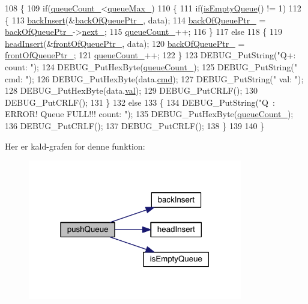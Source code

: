 \begin{DoxyCode}
108 \{
109   \textcolor{keywordflow}{if}(\hyperlink{class_queue_ad260f9ccca00e80d161bbf3e70c3ffa6}{queueCount\_}<\hyperlink{class_queue_acb6b6e88c9e4d12839594b31e6ff7c5a}{queueMax\_})
110   \{
111     \textcolor{keywordflow}{if}(\hyperlink{class_queue_aafb324c79731abdc228dbf94d86722a3}{isEmptyQueue}() != 1)
112     \{
113       \hyperlink{class_queue_a5a25a737ba7dff74923f5cb04e19164c}{backInsert}(&\hyperlink{class_queue_a225d2c9ad4e83d6da443e99b8869a51c}{backOfQueuePtr\_}, data);
114       \hyperlink{class_queue_a225d2c9ad4e83d6da443e99b8869a51c}{backOfQueuePtr\_} = \hyperlink{class_queue_a225d2c9ad4e83d6da443e99b8869a51c}{backOfQueuePtr\_}->\hyperlink{queue_8c_a882bca6dea645e11ca1df6bc3c30ac42}{next\_};
115       \hyperlink{class_queue_ad260f9ccca00e80d161bbf3e70c3ffa6}{queueCount\_}++;
116     \}
117     \textcolor{keywordflow}{else}
118     \{
119       \hyperlink{class_queue_a1189c09234d75518492525645a05db07}{headInsert}(&\hyperlink{class_queue_aa48f05218d0a78402821c8aa9bdad06a}{frontOfQueuePtr\_}, data);
120       \hyperlink{class_queue_a225d2c9ad4e83d6da443e99b8869a51c}{backOfQueuePtr\_} = \hyperlink{class_queue_aa48f05218d0a78402821c8aa9bdad06a}{frontOfQueuePtr\_};
121       \hyperlink{class_queue_ad260f9ccca00e80d161bbf3e70c3ffa6}{queueCount\_}++;
122     \}
123     DEBUG\_PutString(\textcolor{stringliteral}{"Q+: count: "});
124     DEBUG\_PutHexByte(\hyperlink{class_queue_ad260f9ccca00e80d161bbf3e70c3ffa6}{queueCount\_});
125     DEBUG\_PutString(\textcolor{stringliteral}{" cmd: "});
126     DEBUG\_PutHexByte(data.\hyperlink{queue_8h_a85092d82ab6ea85dad51ba78cbda36a0}{cmd});
127     DEBUG\_PutString(\textcolor{stringliteral}{" val: "});
128     DEBUG\_PutHexByte(data.\hyperlink{queue_8h_aa0ccb5ee6d882ee3605ff47745c6467b}{val});
129     DEBUG\_PutCRLF();
130     DEBUG\_PutCRLF();
131   \}
132   \textcolor{keywordflow}{else}
133   \{
134     DEBUG\_PutString(\textcolor{stringliteral}{"Q~: ERROR! Queue FULL!!! count: "});
135     DEBUG\_PutHexByte(\hyperlink{class_queue_ad260f9ccca00e80d161bbf3e70c3ffa6}{queueCount\_});
136     DEBUG\_PutCRLF();
137     DEBUG\_PutCRLF();
138   \}
139   
140 \}
\end{DoxyCode}


Her er kald-\/grafen for denne funktion\+:
\nopagebreak
\begin{figure}[H]
\begin{center}
\leavevmode
\includegraphics[width=265pt]{d4/da4/class_queue_a0012fa831aa1529e5ed3a6610b733423_cgraph}
\end{center}
\end{figure}




